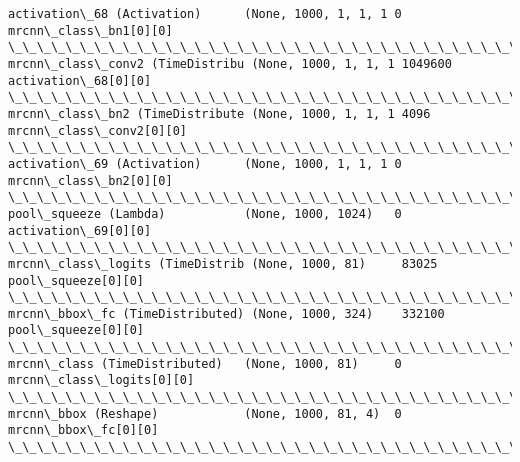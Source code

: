 \documentclass[11pt]{article}
\begin{document}
\begin{Verbatim}[commandchars=\\\{\}]
activation\_68 (Activation)      (None, 1000, 1, 1, 1 0           mrcnn\_class\_bn1[0][0]            
\_\_\_\_\_\_\_\_\_\_\_\_\_\_\_\_\_\_\_\_\_\_\_\_\_\_\_\_\_\_\_\_\_\_\_\_\_\_\_\_\_\_\_\_\_\_\_\_\_\_\_\_\_\_\_\_\_\_\_\_\_\_\_\_\_\_\_\_\_\_\_\_\_\_\_\_\_\_\_\_\_\_\_\_\_\_\_\_\_\_\_\_\_\_\_\_\_\_
mrcnn\_class\_conv2 (TimeDistribu (None, 1000, 1, 1, 1 1049600     activation\_68[0][0]              
\_\_\_\_\_\_\_\_\_\_\_\_\_\_\_\_\_\_\_\_\_\_\_\_\_\_\_\_\_\_\_\_\_\_\_\_\_\_\_\_\_\_\_\_\_\_\_\_\_\_\_\_\_\_\_\_\_\_\_\_\_\_\_\_\_\_\_\_\_\_\_\_\_\_\_\_\_\_\_\_\_\_\_\_\_\_\_\_\_\_\_\_\_\_\_\_\_\_
mrcnn\_class\_bn2 (TimeDistribute (None, 1000, 1, 1, 1 4096        mrcnn\_class\_conv2[0][0]          
\_\_\_\_\_\_\_\_\_\_\_\_\_\_\_\_\_\_\_\_\_\_\_\_\_\_\_\_\_\_\_\_\_\_\_\_\_\_\_\_\_\_\_\_\_\_\_\_\_\_\_\_\_\_\_\_\_\_\_\_\_\_\_\_\_\_\_\_\_\_\_\_\_\_\_\_\_\_\_\_\_\_\_\_\_\_\_\_\_\_\_\_\_\_\_\_\_\_
activation\_69 (Activation)      (None, 1000, 1, 1, 1 0           mrcnn\_class\_bn2[0][0]            
\_\_\_\_\_\_\_\_\_\_\_\_\_\_\_\_\_\_\_\_\_\_\_\_\_\_\_\_\_\_\_\_\_\_\_\_\_\_\_\_\_\_\_\_\_\_\_\_\_\_\_\_\_\_\_\_\_\_\_\_\_\_\_\_\_\_\_\_\_\_\_\_\_\_\_\_\_\_\_\_\_\_\_\_\_\_\_\_\_\_\_\_\_\_\_\_\_\_
pool\_squeeze (Lambda)           (None, 1000, 1024)   0           activation\_69[0][0]              
\_\_\_\_\_\_\_\_\_\_\_\_\_\_\_\_\_\_\_\_\_\_\_\_\_\_\_\_\_\_\_\_\_\_\_\_\_\_\_\_\_\_\_\_\_\_\_\_\_\_\_\_\_\_\_\_\_\_\_\_\_\_\_\_\_\_\_\_\_\_\_\_\_\_\_\_\_\_\_\_\_\_\_\_\_\_\_\_\_\_\_\_\_\_\_\_\_\_
mrcnn\_class\_logits (TimeDistrib (None, 1000, 81)     83025       pool\_squeeze[0][0]               
\_\_\_\_\_\_\_\_\_\_\_\_\_\_\_\_\_\_\_\_\_\_\_\_\_\_\_\_\_\_\_\_\_\_\_\_\_\_\_\_\_\_\_\_\_\_\_\_\_\_\_\_\_\_\_\_\_\_\_\_\_\_\_\_\_\_\_\_\_\_\_\_\_\_\_\_\_\_\_\_\_\_\_\_\_\_\_\_\_\_\_\_\_\_\_\_\_\_
mrcnn\_bbox\_fc (TimeDistributed) (None, 1000, 324)    332100      pool\_squeeze[0][0]               
\_\_\_\_\_\_\_\_\_\_\_\_\_\_\_\_\_\_\_\_\_\_\_\_\_\_\_\_\_\_\_\_\_\_\_\_\_\_\_\_\_\_\_\_\_\_\_\_\_\_\_\_\_\_\_\_\_\_\_\_\_\_\_\_\_\_\_\_\_\_\_\_\_\_\_\_\_\_\_\_\_\_\_\_\_\_\_\_\_\_\_\_\_\_\_\_\_\_
mrcnn\_class (TimeDistributed)   (None, 1000, 81)     0           mrcnn\_class\_logits[0][0]         
\_\_\_\_\_\_\_\_\_\_\_\_\_\_\_\_\_\_\_\_\_\_\_\_\_\_\_\_\_\_\_\_\_\_\_\_\_\_\_\_\_\_\_\_\_\_\_\_\_\_\_\_\_\_\_\_\_\_\_\_\_\_\_\_\_\_\_\_\_\_\_\_\_\_\_\_\_\_\_\_\_\_\_\_\_\_\_\_\_\_\_\_\_\_\_\_\_\_
mrcnn\_bbox (Reshape)            (None, 1000, 81, 4)  0           mrcnn\_bbox\_fc[0][0]              
\_\_\_\_\_\_\_\_\_\_\_\_\_\_\_\_\_\_\_\_\_\_\_\_\_\_\_\_\_\_\_\_\_\_\_\_\_\_\_\_\_\_\_\_\_\_\_\_\_\_\_\_\_\_\_\_\_\_\_\_\_\_\_\_\_\_\_\_\_\_\_\_\_\_\_\_\_\_\_\_\_\_\_\_\_\_\_\_\_\_\_\_\_\_\_\_\_\_

\end{Verbatim}
\end{document}
